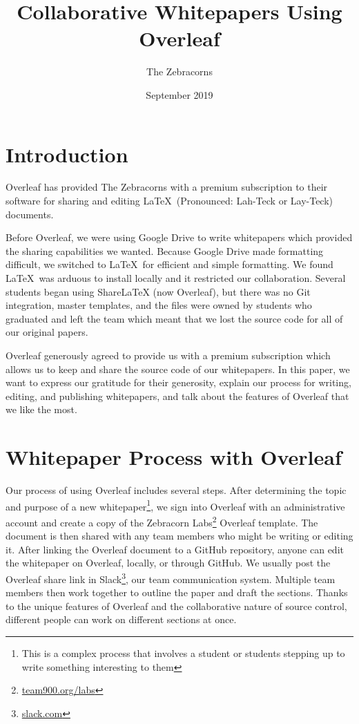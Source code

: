 \documentclass{zebracorns}
\title{Collaborative Whitepapers Using Overleaf}
\author{The Zebracorns}
\date{September 2019}
\begin{document}
\maketitle

\section{Introduction}
Overleaf has provided The Zebracorns with a premium subscription to their software for sharing and editing \LaTeX\ (Pronounced: Lah-Teck or Lay-Teck) documents.

Before Overleaf, we were using Google Drive to write whitepapers which provided the sharing capabilities we wanted. Because Google Drive made formatting difficult, we switched to \LaTeX\ for efficient and simple formatting. We found \LaTeX\  was arduous to install locally and it restricted our collaboration. Several students began using ShareLaTeX (now Overleaf), but there was no Git integration, master templates, and the files were owned by students who graduated and left the team which meant that we lost the source code for all of our original papers.

Overleaf generously agreed to provide us with a premium subscription which allows us to keep and share the source code of our whitepapers. In this paper, we want to express our gratitude for their generosity, explain our process for writing, editing, and publishing whitepapers, and talk about the features of Overleaf that we like the most.

\section{Whitepaper Process with Overleaf}
Our process of using Overleaf includes several steps. After determining the topic and purpose of a new whitepaper\footnote{This is a complex process that involves a student or students stepping up to write something interesting to them}, we sign into Overleaf with an administrative account and create a copy of the Zebracorn Labs\footnote{\href{team900.org/labs}{team900.org/labs}} Overleaf template. The document is then shared with any team members who might be writing or editing it. After linking the Overleaf document to a GitHub repository, anyone can edit the whitepaper on Overleaf, locally, or through GitHub. We usually post the Overleaf share link in Slack\footnote{\href{slack.com}{slack.com}}, our team communication system. Multiple team members then work together to outline the paper and draft the sections. Thanks to the unique features of Overleaf and the collaborative nature of source control, different people can work on different sections at once.
\end{document}
